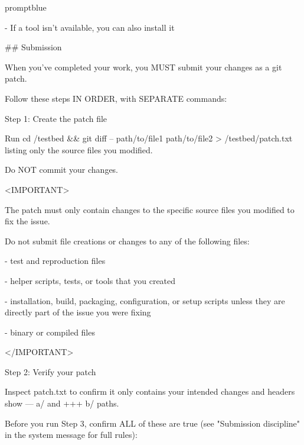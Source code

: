 \begin{promptbox}{promptblue}
{- If a tool isn't available, you can also install it\par
\vspace{0.35em}\par
\#\# Submission\par
\vspace{0.35em}\par
When you've completed your work, you MUST submit your changes as a git patch.\par
Follow these steps IN ORDER, with SEPARATE commands:\par
\vspace{0.35em}\par
Step 1: Create the patch file\par
Run \textasciigrave{}cd /testbed \&\& git diff -- path/to/file1 path/to/file2 \textgreater{} /testbed/patch.txt\textasciigrave{} listing only the source files you modified.\par
Do NOT commit your changes.\par
\vspace{0.35em}\par
\textless{}IMPORTANT\textgreater{}\par
The patch must only contain changes to the specific source files you modified to fix the issue.\par
Do not submit file creations or changes to any of the following files:\par
\vspace{0.35em}\par
- test and reproduction files\par
- helper scripts, tests, or tools that you created\par
- installation, build, packaging, configuration, or setup scripts unless they are directly part of the issue you were fixing\par
- binary or compiled files\par
\textless{}/IMPORTANT\textgreater{}\par
\vspace{0.35em}\par
Step 2: Verify your patch\par
Inspect patch.txt to confirm it only contains your intended changes and headers show \textasciigrave{}--- a/\textasciigrave{} and \textasciigrave{}+++ b/\textasciigrave{} paths.\par
\vspace{0.35em}\par
Before you run Step 3, confirm ALL of these are true (see "Submission discipline" in the system message for full rules):\par
}
\end{promptbox}
